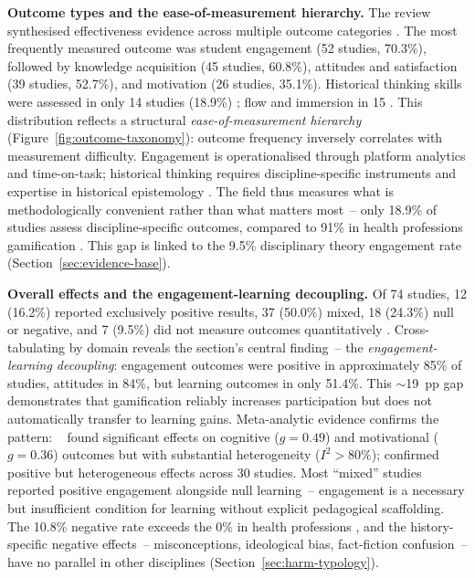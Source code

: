\textbf{Outcome types and the ease-of-measurement hierarchy.}
The review synthesised effectiveness evidence across multiple outcome categories \cite{KorniienkoSemerikov2024}. The most frequently measured outcome was student engagement (52 studies, 70.3\%), followed by knowledge acquisition (45 studies, 60.8\%), attitudes and satisfaction (39 studies, 52.7\%), and motivation (26 studies, 35.1\%). Historical thinking skills were assessed in only 14 studies (18.9\%) \cite{12Gilbert2019108, 56Akkerman2009449, 55Squire2004, 78Rouse2022357, 59Kee2014270}; flow and immersion in 15 \cite{16Chen201447, 19Chou2019, 70Hou201519, 28Chao201734}. This distribution reflects a structural \textit{ease-of-measurement hierarchy} (Figure~\ref{fig:outcome-taxonomy}): outcome frequency inversely correlates with measurement difficulty. Engagement is operationalised through platform analytics and time-on-task; historical thinking requires discipline-specific instruments and expertise in historical epistemology \cite{MonteSano2012, Seixas2013}. The field thus measures what is methodologically convenient rather than what matters most~-- only 18.9\% of studies assess discipline-specific outcomes, compared to 91\% in health professions gamification \cite{vanGaalen2021}. This gap is linked to the 9.5\% disciplinary theory engagement rate (Section~\ref{sec:evidence-base}).



\textbf{Overall effects and the engagement-learning decoupling.}
Of 74 studies, 12 (16.2\%) reported exclusively positive results, 37 (50.0\%) mixed, 18 (24.3\%) null or negative, and 7 (9.5\%) did not measure outcomes quantitatively \cite{KorniienkoSemerikov2024, DichevDicheva2017, Clark2016}. Cross-tabulating by domain reveals the section's central finding~-- the \textit{engagement-learning decoupling}: engagement outcomes were positive in approximately 85\% of studies, attitudes in 84\%, but learning outcomes in only 51.4\%. This $\sim$19~pp gap demonstrates that gamification reliably increases participation but does not automatically transfer to learning gains. Meta-analytic evidence confirms the pattern: \citeauthor{SailerHomner2020}~\cite{SailerHomner2020} found significant effects on cognitive ($g = 0.49$) and motivational ($g = 0.36$) outcomes but with substantial heterogeneity ($I^2 > 80\%$); \cite{BaiHewHuang2020} confirmed positive but heterogeneous effects across 30 studies. Most ``mixed'' studies reported positive engagement alongside null learning~-- engagement is a necessary but insufficient condition for learning without explicit pedagogical scaffolding. The 10.8\% negative rate exceeds the 0\% in health professions \cite{vanGaalen2021}, and the history-specific negative effects~-- misconceptions, ideological bias, fact-fiction confusion~-- have no parallel in other disciplines (Section~\ref{sec:harm-typology}).

